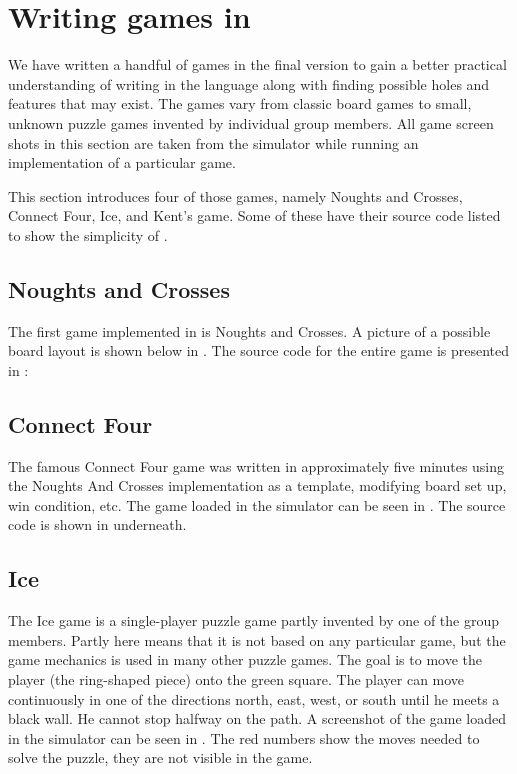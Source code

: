 \section{Writing games in \productname{}}
\label{sec:writinggames}
We have written a handful of games in the final version \productname{}
to gain a better practical understanding of writing in the language
along with finding possible holes and features that may exist. The games
vary from classic board games to small, unknown puzzle games invented by
individual group members. All game screen shots in this section are taken
from the simulator while running an implementation of a particular game.

This section introduces four of those games, namely Noughts and Crosses,
Connect Four, Ice, and Kent's game. Some of these have their source code
listed to show the simplicity of \productname{}.

\subsection{Noughts and Crosses}
The first game implemented in \productname{} is Noughts and
Crosses. A picture of a possible board layout is shown below in
. The source code for the entire game is presented 
in :



\subsection{Connect Four}
\label{sec:connectfour}
The famous Connect Four game was written in approximately five minutes
using the Noughts And Crosses implementation as a template, modifying
board set up, win condition, etc. The game loaded in the simulator can
be seen in . The source code is shown in
 underneath.



\subsection{Ice}
The Ice game is a single-player puzzle game partly invented by one
of the group members. Partly here means that it is not based on any
particular game, but the game mechanics is used in many other puzzle
games. The goal is to move the player (the ring-shaped piece) onto the
green square. The player can move continuously in one of the directions
north, east, west, or south until he meets a black wall. He cannot stop
halfway on the path. A screenshot of the game loaded in the simulator
can be seen in . The red numbers show the moves
needed to solve the puzzle, they are not visible in the game.


